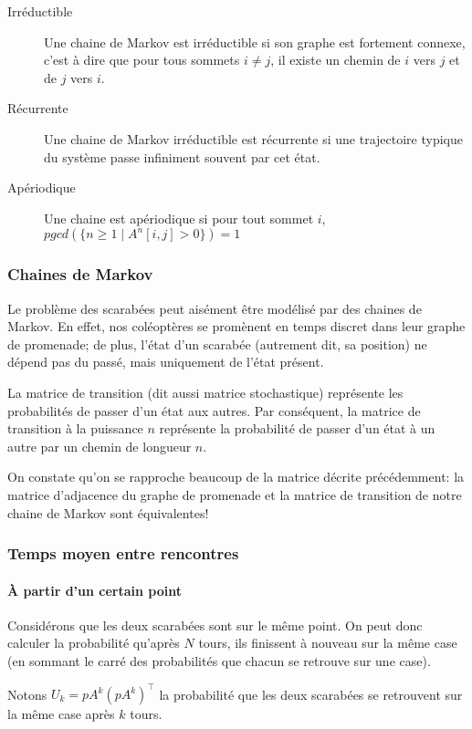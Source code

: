   \begin{description}
    \item[Irréductible] Une chaine de Markov est irréductible si son graphe est
      fortement connexe, c'est à dire que pour tous sommets $i \neq j$, il existe
      un chemin de $i$ vers $j$ et de $j$ vers $i$.
    \item[Récurrente] Une chaine de Markov irréductible est récurrente si une
      trajectoire typique du système passe infiniment souvent par cet état.
    \item[Apériodique] Une chaine est apériodique si pour tout sommet $i$,
      $pgcd(\{ n \geq 1 \mid A^n[i, j] > 0 \}) = 1$
  \end{description}

  \subsubsection{Chaines de Markov}
    Le problème des scarabées peut aisément être modélisé par des chaines de
    Markov. En effet, nos coléoptères se promènent en temps discret dans leur
    graphe de promenade; de plus, l'état d'un scarabée (autrement dit, sa
    position) ne dépend pas du passé, mais uniquement de l'état présent.

    La matrice de transition (dit aussi matrice stochastique) représente les
    probabilités de passer d'un état aux autres. Par conséquent, la matrice de
    transition à la puissance $n$ représente la probabilité de passer d'un état
    à un autre par un chemin de longueur $n$.

    On constate qu'on se rapproche beaucoup de la matrice décrite précédemment:
    la matrice d'adjacence du graphe de promenade et la matrice de transition
    de notre chaine de Markov sont équivalentes!

  \subsubsection{Temps moyen entre rencontres}
    \paragraph{À partir d'un certain point}
      Considérons que les deux scarabées sont sur le même point.  On peut donc
      calculer la probabilité qu'après $N$ tours, ils finissent à nouveau sur
      la même case (en sommant le carré des probabilités que chacun se retrouve
      sur une case).

      Notons $U_k = pA^k(pA^k)^\intercal$ la probabilité que les deux scarabées
      se retrouvent sur la même case après $k$ tours.

